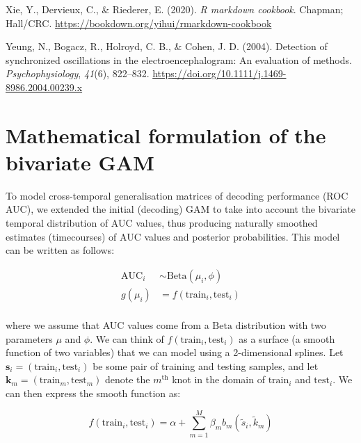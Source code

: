 \documentclass[
  doc,
  floatsintext,
  longtable,
  a4paper,
  nolmodern,
  notxfonts,
  notimes,
  colorlinks=true,linkcolor=blue,citecolor=blue,urlcolor=blue]{apa7}
\newlength{\cslhangindent}
\newenvironment{CSLReferences}[2] %
 {\begin{list}{}{%
  \setlength{\itemindent}{0pt}
  \setlength{\leftmargin}{0pt}
  \setlength{\parsep}{0pt}
  \ifodd #1
   \setlength{\leftmargin}{\cslhangindent}
   \setlength{\itemindent}{-1\cslhangindent}
  \fi
  \setlength{\itemsep}{#2\baselineskip}}}
 {\end{list}}
\begin{document}
\begin{CSLReferences}{1}{0}
Xie, Y., Dervieux, C., \& Riederer, E. (2020). \emph{R markdown
cookbook}. Chapman; Hall/CRC.
\url{https://bookdown.org/yihui/rmarkdown-cookbook}

Yeung, N., Bogacz, R., Holroyd, C. B., \& Cohen, J. D. (2004). Detection
of synchronized oscillations in the electroencephalogram: An evaluation
of methods. \emph{Psychophysiology}, \emph{41}(6), 822--832.
\url{https://doi.org/10.1111/j.1469-8986.2004.00239.x}

\end{CSLReferences}

\newpage

\appendix

\section{Mathematical formulation of the bivariate
GAM}\label{mathematical-formulation-of-the-bivariate-gam}

To model cross-temporal generalisation matrices of decoding performance
(ROC AUC), we extended the initial (decoding) GAM to take into account
the bivariate temporal distribution of AUC values, thus producing
naturally smoothed estimates (timecourses) of AUC values and posterior
probabilities. This model can be written as follows:

\[
\begin{aligned}
\text{AUC}_{i} &\sim \mathrm{Beta}(\mu_{i}, \phi)\\
g(\mu_{i}) &= f \left(\text{train}_{i}, \text{test}_{i} \right)\\
\end{aligned}
\]

where we assume that AUC values come from a \(\mathrm{Beta}\)
distribution with two parameters \(\mu\) and \(\phi\). We can think of
\(f \left(\text{train}_{i}, \text{test}_{i} \right)\) as a surface (a
smooth function of two variables) that we can model using a
2-dimensional splines. Let
\(\mathbf{s}_{i} = \left(\text{train}_{i}, \text{test}_{i} \right)\) be
some pair of training and testing samples, and let
\(\mathbf{k}_{m} = \left(\text{train}_{m}, \text{test}_{m} \right)\)
denote the \(m^{\text{th}}\) knot in the domain of \(\text{train}_{i}\)
and \(\text{test}_{i}\). We can then express the smooth function as:

\[
f \left(\text{train}_{i}, \text{test}_{i} \right) = \alpha + \sum_{m=1}^M \beta_{m} b_{m} \left(\tilde{s}_{i}, \tilde{k}_{m} \right)
\]
\end{document}
